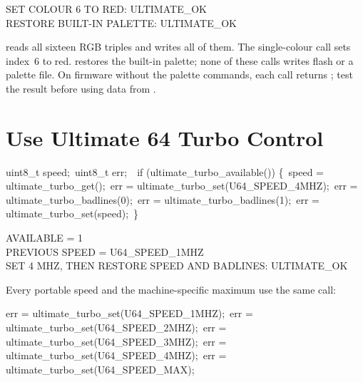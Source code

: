 \begin{resultbox}
SET COLOUR 6 TO RED: ULTIMATE_OK\\
RESTORE BUILT-IN PALETTE: ULTIMATE_OK
\end{resultbox}

 reads all sixteen RGB triples and
 writes all of them. The single-colour call sets
index~6 to red.  restores the built-in palette;
none of these calls writes flash or a palette file.
On firmware without the palette commands, each call returns
; test the result before using data from
.


\section{Use Ultimate 64 Turbo Control}

\begin{listingbox}
uint8\_t speed;\
uint8\_t err;\
\
if (ultimate\_turbo\_available()) \{\
\hspace*{1em}speed = ultimate\_turbo\_get();\
\hspace*{1em}err = ultimate\_turbo\_set(U64\_SPEED\_4MHZ);\
\hspace*{1em}err = ultimate\_turbo\_badlines(0);\
\hspace*{1em}err = ultimate\_turbo\_badlines(1);\
\hspace*{1em}err = ultimate\_turbo\_set(speed);\
\}
\end{listingbox}

\begin{resultbox}
AVAILABLE = 1\\
PREVIOUS SPEED = U64_SPEED_1MHZ\\
SET 4 MHZ, THEN RESTORE SPEED AND BADLINES: ULTIMATE_OK
\end{resultbox}

Every portable speed and the machine-specific maximum use the same call:

\begin{listingbox}
err = ultimate\_turbo\_set(U64\_SPEED\_1MHZ);\
err = ultimate\_turbo\_set(U64\_SPEED\_2MHZ);\
err = ultimate\_turbo\_set(U64\_SPEED\_3MHZ);\
err = ultimate\_turbo\_set(U64\_SPEED\_4MHZ);\
err = ultimate\_turbo\_set(U64\_SPEED\_MAX);
\end{listingbox}

